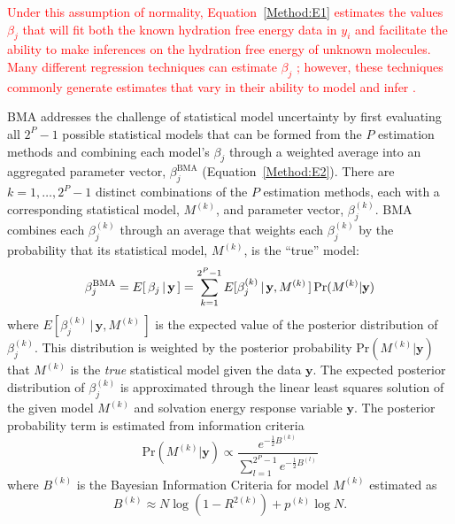 \documentclass[journal=jpcbfk, manuscript=article]{achemso}
\newcommand{\LG}[1]{\textcolor{black}{#1}}
\newcommand{\+}[1]{\ensuremath{\mathbf{#1}}}
\renewcommand{\vec}[1]{{\mathbf{#1}}}
\newcommand{\rev}[1]{\textsf{\textcolor{red}{#1}}}
\begin{document}
\rev{Under this assumption of normality, Equation~\ref{Method:E1} estimates the values $\beta_j$ that will fit both the known hydration free energy data in $y_i$ and facilitate the ability to make inferences on the hydration free energy of unknown molecules.  
Many different regression techniques can estimate $\beta_j$ \cite{Hosmer:1989,Reiss:2012,Mallows:1973,Candes:2007}; however, these techniques commonly generate estimates that vary in their ability to model and infer \cite{Genell:2010,Hoeting:1999,Davidson:2006,Raftery:1995,Raftery:1998}.}

BMA addresses the challenge of statistical model uncertainty by first evaluating all $2^{P}-1$ possible statistical models that can be formed from the $P$ estimation methods and combining each model's $\beta_j$ through a weighted average into an aggregated parameter vector, $\beta_j^{\text{BMA}}$ (Equation~\ref{Method:E2}).
There are $k = 1, \ldots, 2^P-1$ distinct combinations of the $P$ estimation methods, each with a corresponding statistical model, $M^{(k)}$, and parameter vector, $\beta^{(k)}_j$. 
BMA combines each $\beta_{j}^{(k)}$ through an average that weights each $\beta^{(k)}_j$ by the probability that its statistical model, $M^{(k)}$, is the ``true'' model:
\begin{equation} \label{Method:E2}
	\LG{\beta_j^{\text{BMA}} = E[\,\beta_j \,|\, \+y\,]  = \sum_{k=1}^{2^P-1} E[\beta_{j}^{(k)}\,|\, \+y,M^{(k)}\,] \, {\mathrm{Pr}}(M^{(k)} | \+y)}
\end{equation}
where $E[\beta_{j}^{(k)}\,|\, \+y,M^{(k)}\,]$ is the expected value of the posterior distribution of $\beta^{(k)}_j$.
This distribution is weighted by the posterior probability ${\mathrm{Pr}}(M^{(k)} | \+y)$ that $M^{(k)}$ is the \emph{true} statistical model given the data $\textbf{y}$.
The expected posterior distribution of $\beta^{(k)}_j$ is approximated through the linear least squares solution of the given model $M^{(k)}$ and solvation energy response variable $\vec{y}$.
The posterior probability term is estimated from information criteria \cite{Raftery:1995}
\begin{equation} \label{Method:E3} 
	{\mathrm{Pr}}(M^{(k)} | \+y) \propto \frac{e^{-\frac{1}{2}B^{(k)}}}{\sum^{2^P-1}_{l=1} e^{-\frac{1}{2}B^{(l)}}} 
\end{equation}
where $B^{(k)}$ is the Bayesian Information Criteria for model $M^{(k)}$ estimated as
\begin{equation} \label{Method:E4} 
	B^{(k)} \approx N \log{(1-R^{2(k)})} + p^{(k)} \log{N}.
\end{equation}
\end{document}
